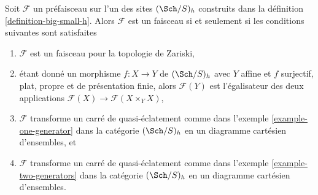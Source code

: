 \begin{lemma}
\label{lemma-refine-check-h}
Soit $\mathcal{F}$ un préfaisceau sur l'un des sites $(\Sch/S)_h$
construits dans la définition \ref{definition-big-small-h}.
Alors $\mathcal{F}$ est un faisceau si et seulement si les
conditions suivantes sont satisfaites
\begin{enumerate}
\item $\mathcal{F}$ est un faisceau pour la topologie de Zariski,
\item étant donné un morphisme $f : X \to Y$ de $(\Sch/S)_h$ avec $Y$ affine
et $f$ surjectif, plat, propre et de présentation finie, alors
$\mathcal{F}(Y)$ est l'égalisateur des deux applications
$\mathcal{F}(X) \to \mathcal{F}(X \times_Y X)$,
\item $\mathcal{F}$ transforme un carré de quasi-éclatement comme dans
l'exemple \ref{example-one-generator} dans la catégorie $(\Sch/S)_h$
en un diagramme cartésien d'ensembles, et
\item $\mathcal{F}$ transforme un carré de quasi-éclatement comme dans
l'exemple \ref{example-two-generators} dans la catégorie $(\Sch/S)_h$
en un diagramme cartésien d'ensembles.
\end{enumerate}
\end{lemma}

